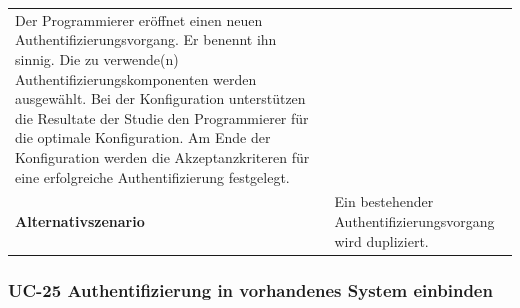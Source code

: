 \begin{longtable}[c]{@{}ll@{}}
\begin{minipage}[t]{0.60\columnwidth}\raggedright\strut
Der Programmierer eröffnet einen neuen Authentifizierungsvorgang. Er
benennt ihn sinnig. Die zu verwende(n) Authentifizierungskomponenten
werden ausgewählt. Bei der Konfiguration unterstützen die Resultate der
Studie den Programmierer für die optimale Konfiguration. Am Ende der
Konfiguration werden die Akzeptanzkriteren für eine erfolgreiche
Authentifizierung festgelegt.
\strut\end{minipage}\tabularnewline
\begin{minipage}[t]{0.34\columnwidth}\raggedright\strut
\textbf{Alternativszenario}
\strut\end{minipage} &
\begin{minipage}[t]{0.60\columnwidth}\raggedright\strut
Ein bestehender Authentifizierungsvorgang wird dupliziert.
\strut\end{minipage}\tabularnewline
\bottomrule
\end{longtable}

\subsubsection{UC-25 Authentifizierung in vorhandenes System
einbinden}\label{uc-25-authentifizierung-in-vorhandenes-system-einbinden}

